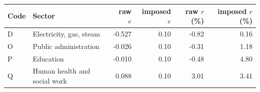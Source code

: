\begin{tabular}{llrrrr}
\toprule
Code & Sector & raw $e$ & imposed $e$ & raw $r$ (\%) & imposed $r$ (\%) \\
\midrule
D & Electricity, gas, steam & -0.527 & 0.10 & -0.82 & 0.16 \\
O & Public administration & -0.026 & 0.10 & -0.31 & 1.18 \\
P & Education & -0.010 & 0.10 & -0.48 & 4.80 \\
Q & Human health and social work & 0.088 & 0.10 & 3.01 & 3.41 \\
\bottomrule
\end{tabular}

